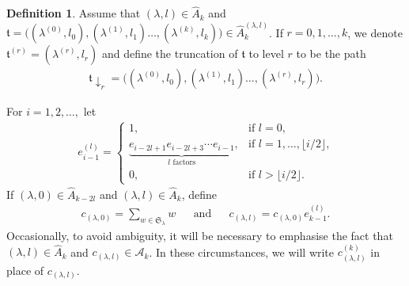 \documentclass[11pt,a4paper,reqno,svgnames]{amsart}
\theoremstyle{plain}
\theoremstyle{definition}
\newtheorem{definition}[theorem]{Definition}
\numberwithin{equation}{section}
\begin{document}
\begin{definition}
Assume that $(\lambda,l)\in\hat{A}_k$ and $\mathfrak{t}=\big( (\lambda^{(0)},l_0),(\lambda^{(1)},l_1)\ldots,(\lambda^{(k)},l_k))\in\hat{A}_k^{(\lambda,l)}$. If $r=0,1,\ldots,k$, we denote $\mathfrak{t}^{(r)}=(\lambda^{(r)},l_r)$ and define the truncation of $\mathfrak{t}$ to level $r$ to be the path
\begin{align*}
\mathfrak{t}\downarrow _r=\big( (\lambda^{(0)},l_0),(\lambda^{(1)},l_1)\ldots,(\lambda^{(r)},l_r)).
\end{align*}
\end{definition}

For $i=1,2,\ldots,$ let
\begin{align*}
e_{i-1}^{(l)}=
\begin{cases}
1, &\text{if $l=0$,}\\
\underbrace{e_{i-{2l}+1}e_{i-2l+3}\cdots e_{i-1}}_{\text{${l}$ factors}},&\text{if $l=1,\ldots,\lfloor i/2\rfloor$,}\\
0,&\text{if $l>\lfloor i/2\rfloor$.}
\end{cases}
\end{align*}
If $(\lambda,0)\in\hat{A}_{k-2l}$ and $(\lambda,l)\in\hat{A}_k$, define
\begin{align*}
c_{(\lambda,0)}= \sum_{w\in\mathfrak{S}_\lambda}w &&\text{and}&& c_{(\lambda,l)}= c_{(\lambda,0)}e_{k-1}^{(l)}. 
\end{align*}
Occasionally, to avoid ambiguity, it will be necessary to emphasise the fact that $(\lambda,l)\in\hat{A}_k$ and $c_{(\lambda,l)}\in \mathcal{A}_k$. In these circumstances, we will write $c_{(\lambda,l)}^{(k)}$ in place of $c_{(\lambda,l)}$. 
\end{document}

